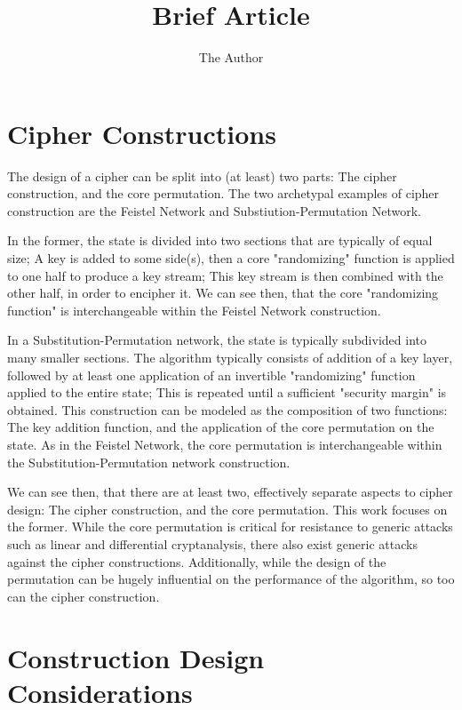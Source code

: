 \documentclass[11pt]{article} %
\title{Brief Article}
\author{The Author}
\begin{document}
\maketitle

\section{Cipher Constructions}

The design of a cipher can be split into (at least) two parts: The cipher construction, and the core permutation. The two archetypal examples of cipher construction are the Feistel Network and Substiution-Permutation Network.

In the former, the state is divided into two sections that are typically of equal size; A key is added to some side(s), then a core "randomizing" function is applied to one half to produce a key stream; This key stream is then combined with the other half, in order to encipher it. We can see then, that the core "randomizing function" is interchangeable within the Feistel Network construction.

In a Substitution-Permutation network, the state is typically subdivided into many smaller sections. The algorithm typically consists of addition of a key layer, followed by at least one application of an invertible "randomizing" function applied to the entire state; This is repeated until a sufficient "security margin" is obtained. This construction can be modeled as the composition of two functions: The key addition function, and the application of the core permutation on the state. As in the Feistel Network, the core permutation is interchangeable within the Substitution-Permutation network construction.

We can see then, that there are at least two, effectively separate aspects to cipher design: The cipher construction, and the core permutation. This work focuses on the former. While the core permutation is critical for resistance to generic attacks such as linear and differential cryptanalysis, there also exist generic attacks against the cipher constructions. Additionally, while the design of the permutation can be hugely influential on the performance of the algorithm, so too can the cipher construction.

\section{Construction Design Considerations}
\end{document}
